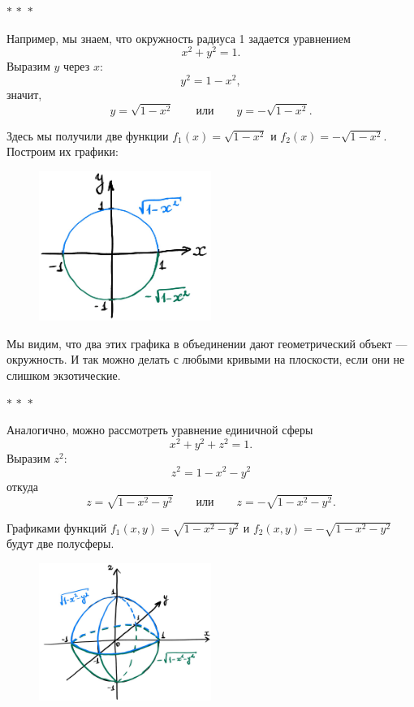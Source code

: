 \documentclass[a4paper,12pt]{article}
\newcommand{\threestars}{\begin{center}$ {\ast}\,{\ast}\,{\ast} $\end{center}}
\newcounter{z-counter}
\newcounter{th-counter}
\begin{document}
\threestars

Например, мы знаем, что окружность радиуса 1 задается уравнением
\[
x^2 + y^2 = 1.
\]
Выразим $y$ через $x$:
\[
y^2 = 1 - x^2,
\]
значит,
\[
y = \sqrt{1-x^2} \qquad \text{или}\qquad y = -\sqrt{1-x^2}.
\]

Здесь мы получили две функции $f_1(x) = \sqrt{1-x^2}$ и $f_2(x) = -\sqrt{1-x^2}$. Построим их графики:

\begin{figure}[h] %
    \centering
    \includegraphics[width=0.5\textwidth]{pictures/pct_circle_plot.jpg}
\end{figure}

Мы видим, что два этих графика в объединении дают геометрический объект --- окружность. И так можно делать с любыми кривыми на плоскости, если они не слишком экзотические.

\threestars

Аналогично, можно рассмотреть уравнение единичной сферы
\[
x^2 + y^2 + z^2 = 1.
\]
Выразим $z^2$:
\[
z^2 = 1 - x^2 - y^2
\]
откуда
\[
z = \sqrt{1-x^2 - y^2} \qquad \text{или}\qquad z = -\sqrt{1-x^2 - y^2}.
\]

Графиками функций $f_1(x,y) = \sqrt{1-x^2 - y^2}$ и $f_2(x,y) = -\sqrt{1-x^2 - y^2}$ будут две полусферы.

\begin{figure}[H]
    \centering
    \includegraphics[width=0.5\textwidth]{pictures/pct_sphere_plot.jpg}
\end{figure}
\end{document}
